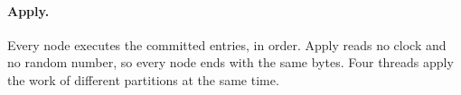 
\paragraph{Apply.} Every node executes the committed entries, in order. Apply reads no clock and no
random number, so every node ends with the same bytes. Four threads apply the work of different
partitions at the same time.
